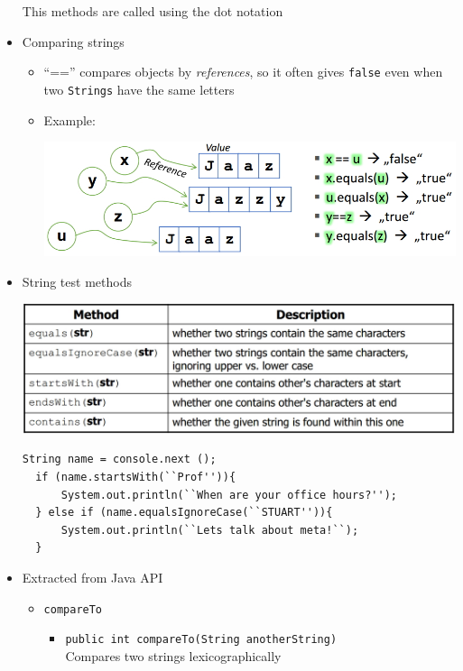 \documentclass[a4paper]{article}
\newcommand{\inline}[1]{\lstinline!#1!}%
\begin{document}
\begin{itemize}
\begin{center}
      \end{center}
      This methods are called using the dot notation
  \item Comparing strings
    \begin{itemize}
      \item ``=='' compares objects by \textit{references}, so it often gives \inline{false} even when two \inline{Strings} have the same letters
      \item Example:\\
      \begin{center}
        \includegraphics[scale=1.2]{Figures/StringExample.jpg}
      \end{center}
    \end{itemize}
  \item String test methods
    \begin{center}
      \includegraphics[scale=1]{Figures/StringTestMethods.jpg}
    \end{center}
  \begin{lstlisting}
String name = console.next ();
  if (name.startsWith(``Prof'')){
      System.out.println(``When are your office hours?'');
  } else if (name.equalsIgnoreCase(``STUART'')){
      System.out.println(``Lets talk about meta!``);
  }
  \end{lstlisting}
  \item Extracted from Java API
    \begin{itemize}
      \item \inline{compareTo}
        \begin{itemize}
          \item \inline{public int compareTo(String anotherString)}\\Compares two strings lexicographically

\end{itemize}
\end{itemize}
\end{itemize}
\end{document}
